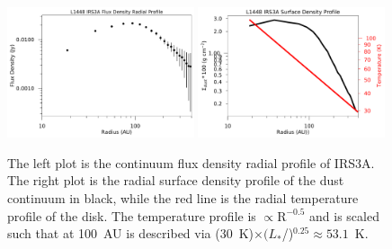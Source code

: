 \begin{figure}[H]
\begin{center}
\includegraphics[width=0.49\textwidth]{img/L1448N-intensity-rad-xsec-cont_robust-05_wide.pdf}
\includegraphics[width=0.49\textwidth]{img/L1448N-surface-density-lograd-xsec-cont_robust-05_wide.pdf}
\end{center}
\caption{The left plot is the continuum flux density radial profile of IRS3A. The right plot is the radial surface density profile of the dust continuum in black, while the red line is the radial temperature profile of the disk. The temperature profile is $\propto\text{R}^{-0.5}$ and is scaled such that at 100~AU is described via (30~K)$\times(L_{*}$/\lsun)$^{0.25}\approx53.1$~K.}\label{fig:irs3asurfacedensity}
\end{figure}




